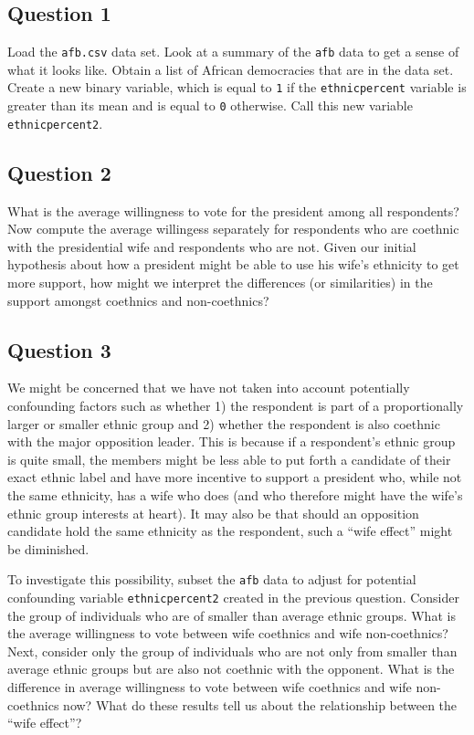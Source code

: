 \documentclass[]{article}
\begin{document}
\subsection{Question 1}\label{question-1}

Load the \texttt{afb.csv} data set. Look at a summary of the
\texttt{afb} data to get a sense of what it looks like. Obtain a list of
African democracies that are in the data set. Create a new binary
variable, which is equal to \texttt{1} if the \texttt{ethnicpercent}
variable is greater than its mean and is equal to \texttt{0} otherwise.
Call this new variable \texttt{ethnicpercent2}.

\subsection{Question 2}\label{question-2}

What is the average willingness to vote for the president among all
respondents? Now compute the average willingess separately for
respondents who are coethnic with the presidential wife and respondents
who are not. Given our initial hypothesis about how a president might be
able to use his wife's ethnicity to get more support, how might we
interpret the differences (or similarities) in the support amongst
coethnics and non-coethnics?

\subsection{Question 3}\label{question-3}

We might be concerned that we have not taken into account potentially
confounding factors such as whether 1) the respondent is part of a
proportionally larger or smaller ethnic group and 2) whether the
respondent is also coethnic with the major opposition leader. This is
because if a respondent's ethnic group is quite small, the members might
be less able to put forth a candidate of their exact ethnic label and
have more incentive to support a president who, while not the same
ethnicity, has a wife who does (and who therefore might have the wife's
ethnic group interests at heart). It may also be that should an
opposition candidate hold the same ethnicity as the respondent, such a
``wife effect'' might be diminished.

To investigate this possibility, subset the \texttt{afb} data to adjust
for potential confounding variable \texttt{ethnicpercent2} created in
the previous question. Consider the group of individuals who are of
smaller than average ethnic groups. What is the average willingness to
vote between wife coethnics and wife non-coethnics? Next, consider only
the group of individuals who are not only from smaller than average
ethnic groups but are also not coethnic with the opponent. What is the
difference in average willingness to vote between wife coethnics and
wife non-coethnics now? What do these results tell us about the
relationship between the ``wife effect''?
\end{document}
